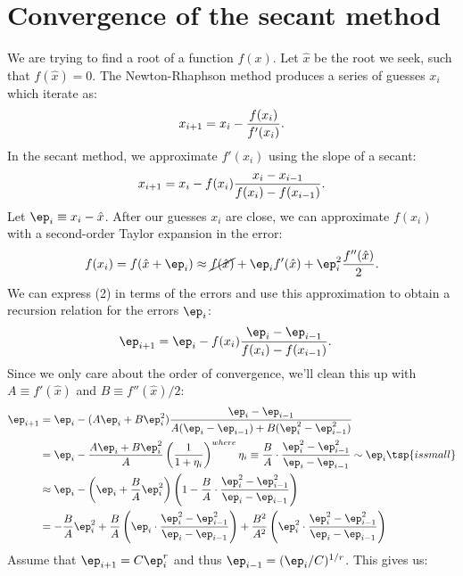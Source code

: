 \documentclass{article}
\begin{document}
\section{Convergence of the secant method}

We are trying to find a root of a function $f(x)$. Let $\hat x$ be the
root we seek, such that $f(\hat x) = 0$. The Newton-Rhaphson method produces
a series of guesses $x_i$ which iterate as:
\begin{align}
    x_{i+1} = x_i - {f(x_i) \over f'(x_i)}.
\end{align}
In the secant method, we approximate $f'(x_i)$ using the slope of a secant:
\begin{align}
    x_{i+1} = x_i - f(x_i) {x_i - x_{i-1} \over f(x_i) - f(x_{i-1})}.
\end{align}
Let $\ep_i \equiv x_i - \hat x$. After our guesses $x_i$ are close, we can
approximate $f(x_i)$ with a second-order Taylor expansion in the error:
\begin{align}
    f(x_i) = f(\hat x + \ep_i)
    \approx \cancel{f(\hat x)} + \ep_i f'(\hat x)
    + \ep_i^2 {f''(\hat x) \over 2}.
\end{align}
We can express (2) in terms of the errors and use this approximation to
obtain a recursion relation for the errors $\ep_i$:
\begin{align}
    \ep_{i+1} &= \ep_i - f(x_i) {\ep_i - \ep_{i-1} \over f(x_i) - f(x_{i-1})}.
\end{align}
Since we only care about the order of convergence, we'll clean this up
with $A \equiv f'(\hat x)$ and $B \equiv f''(\hat x) / 2$:
\begin{align}
    \ep_{i+1} &=
    \ep_i - (A\ep_i + B\ep_i^2)
    {
        \ep_i - \ep_{i-1}
        \over
        A(\ep_i - \ep_{i-1}) + B(\ep_i^2 - \ep_{i-1}^2)
    }
    \\ &=
    \ep_i - {A\ep_i + B\ep_i^2 \over A}
    \left(
        1
        \over
        1 + \eta_i
    \right)
    \sp{where}
    \eta_i \equiv {B \over A} \cdot
    {\ep_i^2 - \ep_{i-1}^2 \over \ep_i - \ep_{i-1}}
    \sim \ep_i \tsp{is small}
    \\ &\approx
    \ep_i - \left(\ep_i + {B \over A} \ep_i^2\right)
    \left(
        1 -
        {B \over A} \cdot
        {\ep_i^2 - \ep_{i-1}^2 \over \ep_i - \ep_{i-1}}
    \right)
    \\ &=
    - {B \over A} \ep_i^2 +
    {B \over A} \left( \ep_i \cdot
        {\ep_i^2 - \ep_{i-1}^2 \over \ep_i -\ep_{i-1}}
    \right)
    +
    {B^2 \over A^2} \left( \ep_i^2 \cdot
        {\ep_i^2 - \ep_{i-1}^2 \over \ep_i -\ep_{i-1}}
    \right)
\end{align}
Assume that $\ep_{i+1} = C \ep_i^r$ and thus $\ep_{i-1} = (\ep_i / C)^{1/r}$.
This gives us:
\end{document}
